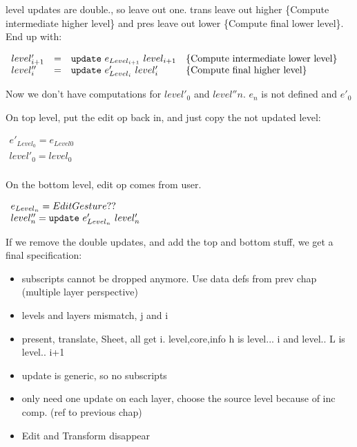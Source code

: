 level updates are double., so leave out one. trans leave out higher \{Compute intermediate higher level\} and pres leave out lower \{Compute final lower level\}. End up with:

\begin{small}\( \begin{array}{lcll} 
level'_{i+1} 	& = & {\tt update}~e_{Level_{i+1}}~level_{i+1}                 & \text{\{Compute intermediate lower level\}}\\
level''_{i} & = & {\tt update}~e'_{Level_{i}}~level'_{i}                 & \text{\{Compute final higher level\}}\\
\end{array}\)
\end{small}

Now we don't have computations for $level'_0$ and $level''{n}$. $e_n$ is not defined and $e'_0$


On top level, put the edit op back in, and just copy the not updated level:

\begin{small}\( \begin{array}{lcll} 
e'_{Level_{0}}  = e_{Level{0}}\\
level'_{0} =  level_{0}\\
\end{array}\)
\end{small}

On the bottom level, edit op comes from user. 

\begin{small}\( \begin{array}{lcll} 
e_{Level_{n}}  = EditGesture ??\\
level''_{n}  =  {\tt update}~e'_{Level_{n}}~level'_{n}\\
\end{array}\)
\end{small}


If we remove the double updates, and add the top and bottom stuff, we get a final specification:

\begin{itemize}
\item subscripts cannot be dropped anymore. Use data defs from prev chap (multiple layer perspective)
\item levels and layers mismatch, j and i
\item present, translate, Sheet, all get i.  level,core,info h is level... i and level.. L is level.. i+1
\item update is generic, so no subscripts
\item only need one update on each layer, choose the source level because of inc comp. (ref to previous chap)
\item Edit and Transform disappear
\end{itemize}

